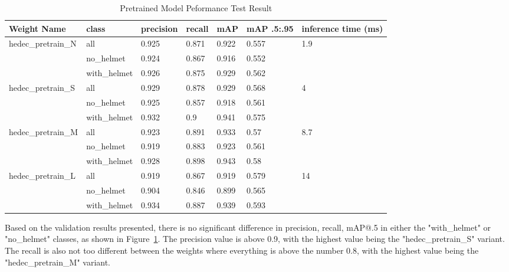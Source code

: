 \begin{table}
  \centering
  \caption{Pretrained Model Peformance Test Result}
  \label{tb:pretrainbenchmarktest}
  \begin{tabular}{|l|l|l|l|l|l|l||} 
    \hline
    Weight Name                          & class        & precision & recall & mAP   & mAP .5:.95 & inference time (ms)    \\ 
    \hline
    \multirow{3}{*}{hedec\_pretrain\_N} & all          & 0.925     & 0.871  & 0.922 & 0.557      & \multirow{3}{*}{1.9}   \\
                                        & no\_helmet   & 0.924     & 0.867  & 0.916 & 0.552      &                        \\
                                        & with\_helmet & 0.926     & 0.875  & 0.929 & 0.562      &                        \\ 
    \hline
    \multirow{3}{*}{hedec\_pretrain\_S} & all          & 0.929     & 0.878  & 0.929 & 0.568      & \multirow{3}{*}{4}     \\
                                        & no\_helmet   & 0.925     & 0.857  & 0.918 & 0.561      &                        \\
                                        & with\_helmet & 0.932     & 0.9    & 0.941 & 0.575      &                        \\ 
    \hline
    \multirow{3}{*}{hedec\_pretrain\_M} & all          & 0.923     & 0.891  & 0.933 & 0.57       & \multirow{3}{*}{8.7}   \\
                                        & no\_helmet   & 0.919     & 0.883  & 0.923 & 0.561      &                        \\
                                        & with\_helmet & 0.928     & 0.898  & 0.943 & 0.58       &                        \\ 
    \hline
    \multirow{3}{*}{hedec\_pretrain\_L} & all          & 0.919     & 0.867  & 0.919 & 0.579      & \multirow{3}{*}{14}    \\
                                        & no\_helmet   & 0.904     & 0.846  & 0.899 & 0.565      &                        \\
                                        & with\_helmet & 0.934     & 0.887  & 0.939 & 0.593      &                        \\ 
    \hline
  \end{tabular}
\end{table}

\par Based on the validation results presented, there is no significant difference in precision, recall, mAP@.5 in either the "with\_helmet" or "no\_helmet" classes, as shown in Figure~\ref{tb:pretrainbenchmarktest}. The precision value is above 0.9, with the highest value being the "hedec\_pretrain\_S" variant. The recall is also not too different between the weights where everything is above the number 0.8, with the highest value being the "hedec\_pretrain\_M" variant.



